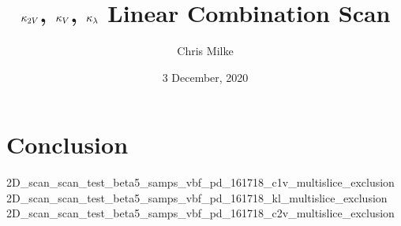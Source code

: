 \documentclass{beamer}
\begin{document}
    \title{$\kappa_{2V}$, $\kappa_{V}$, $\kappa_{\lambda}$ Linear Combination Scan}
    \author{Chris Milke}
    \date{3 December, 2020}

    \frame{\titlepage}

    
    
    

    \section{Conclusion}
    {2D_scan_scan_test_beta5_samps_vbf_pd_161718_c1v_multislice_exclusion}
    {2D_scan_scan_test_beta5_samps_vbf_pd_161718_kl_multislice_exclusion}
    {2D_scan_scan_test_beta5_samps_vbf_pd_161718_c2v_multislice_exclusion}

\end{document}
